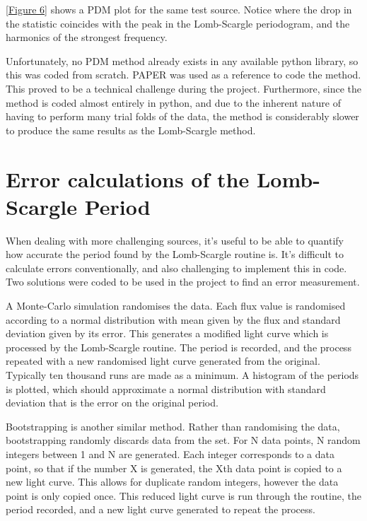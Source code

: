 \ref{Figure 6} shows a PDM plot for the same test source. Notice where the drop in the statistic coincides with the peak in the Lomb-Scargle periodogram, and the harmonics of the strongest frequency.

Unfortunately, no PDM method already exists in any available python library, so this was coded from scratch. PAPER was used as a reference to code the method. This proved to be a technical challenge during the project. Furthermore, since the method is coded almost entirely in python, and due to the inherent nature of having to perform many trial folds of the data, the method is considerably slower to produce the same results as the Lomb-Scargle method. 

\section{Error calculations of the Lomb-Scargle Period}

When dealing with more challenging sources, it\textquoteright{}s useful to be able to quantify how accurate the period found by the Lomb-Scargle routine is. It\textquoteright{}s difficult to calculate errors conventionally, and also challenging to implement this in code. Two solutions were coded to be used in the project to find an error measurement. 

A Monte-Carlo simulation randomises the data. Each flux value is randomised according to a normal distribution with mean given by the flux and standard deviation given by its error. This generates a modified light curve which is processed by the Lomb-Scargle routine. The period is recorded, and the process repeated with a new randomised light curve generated from the original. Typically ten thousand runs are made as a minimum. A histogram of the periods is plotted, which should approximate a normal distribution with standard deviation that is the error on the original period.

Bootstrapping is another similar method. Rather than randomising the data, bootstrapping randomly discards data from the set. For N data points, N random integers between 1 and N are generated. Each integer corresponds to a data point, so that if the number X is generated, the Xth data point is copied to a new light curve. This allows for duplicate random integers, however the data point is only copied once. This reduced light curve is run through the routine, the period recorded, and a new light curve generated to repeat the process. 
